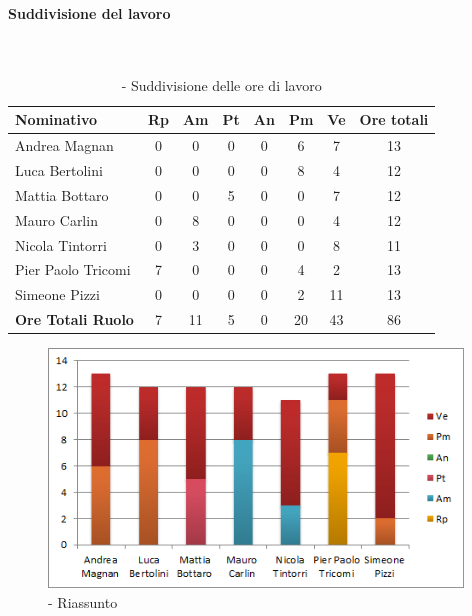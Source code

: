 \documentclass[./PianoDiProgetto.tex]{subfiles}
\begin{document}
\vspace{35mm}


	\subsubsection{\PerV}
				\paragraph{Suddivisione del lavoro}\

	\begin{table}[H]
		\begin{tabularx}{\textwidth}{l  * {6}{c}  c}
			\toprule
			\textbf{Nominativo} & \textbf{Rp} & \textbf{Am} & \textbf{Pt}
						& \textbf{An} & \textbf{Pm} & \textbf{Ve} & \textbf{Ore totali} \\
			\midrule
			Andrea Magnan  & 0 & 0 & 0 & 0 & 6 & 7 & 13 \\
			Luca Bertolini  & 0 & 0 & 0 & 0 & 8 & 4 & 12 \\
			Mattia Bottaro  & 0 & 0 & 5 & 0 & 0 & 7 & 12 \\
			Mauro Carlin  & 0 & 8 & 0 & 0 & 0 & 4 & 12 \\
			Nicola Tintorri  & 0 & 3 & 0 & 0 & 0 & 8 & 11 \\
			Pier Paolo Tricomi  & 7 & 0 & 0 & 0 & 4 & 2 & 13 \\
			Simeone Pizzi & 0 & 0 & 0 & 0 & 2 & 11 & 13 \\
			\midrule
			\textbf{Ore Totali Ruolo} & 7 & 11 & 5 & 0 & 20 & 43 & 86 \\
			\bottomrule
		\end{tabularx}
		\caption{\PerV{} - Suddivisione delle ore di lavoro}
	\end{table}
\vfill


	\begin{figure}[H]
		\centering
		\includegraphics[width=11cm, trim=1cm 0cm 1cm 0cm]{grafici/V-persona}
			\caption{\PerV{} - Riassunto}
	\end{figure}
\end{document}
